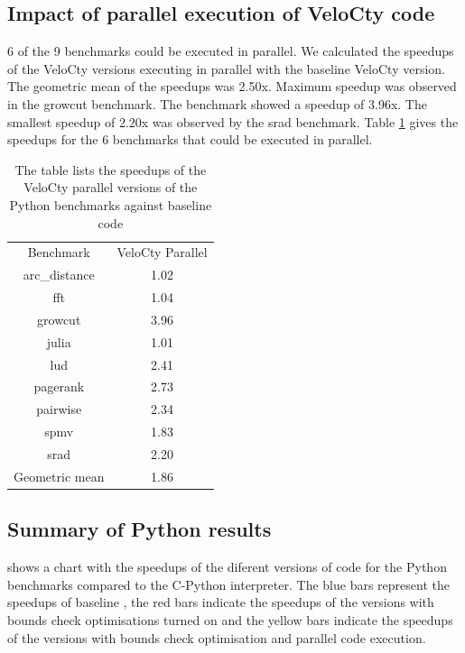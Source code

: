 \subsection{Impact of parallel execution of VeloCty code}
6 of the 9 benchmarks could be executed in parallel. We calculated the speedups of the VeloCty versions executing in parallel with the baseline VeloCty version. The geometric mean of the speedups was 2.50x. Maximum speedup was observed in the growcut benchmark. The benchmark showed a speedup of 3.96x. The smallest speedup of 2.20x  was observed by the srad benchmark. Table \ref{tab:cpvscwopy} gives the speedups for the 6 benchmarks that could be executed in parallel.
\begin{table}[h]
\centering
\begin{tabular}{|c|c|}
\hline
Benchmark      & VeloCty Parallel \\ \hhline{|=|=|}
arc\_distance  & 1.02             \\ \hline
fft            & 1.04             \\ \hline
growcut        & 3.96             \\ \hline
julia          & 1.01             \\ \hline
lud            & 2.41             \\ \hline
pagerank       & 2.73             \\ \hline
pairwise       & 2.34             \\ \hline
spmv           & 1.83             \\ \hline
srad           & 2.20             \\ \hline
Geometric mean & 1.86             \\ \hline
\end{tabular}
\caption[Speedup of VeloCty parallel for Python]{The table lists the speedups of the VeloCty parallel versions of the Python benchmarks against baseline \velocty code}
\label{tab:cpvscwopy}
\end{table}

\subsection{Summary of Python results}
 shows a chart with the speedups of the diferent versions of \velocty code for the Python benchmarks compared to the C-Python interpreter. The blue bars represent the speedups of baseline \velocty, the red bars indicate the speedups of the \velocty versions with bounds check optimisations turned on and the yellow bars indicate the speedups of the \velocty versions with bounds check optimisation and parallel code execution. 

